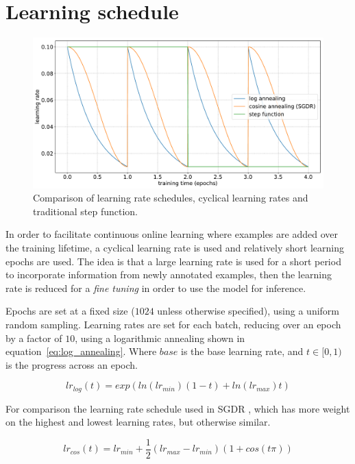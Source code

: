 \section {Learning schedule}
\label{sec:schedule}

\begin{figure}[h]
  \centering
  \includegraphics[width=1.0\linewidth]{charts/training/lr_schedules.pdf}
  \caption{Comparison of learning rate schedules, cyclical learning rates and traditional step function.  }  
  \label{fig:lr_schedule}
\end{figure}

In order to facilitate continuous online learning where examples are added over the training lifetime, a cyclical learning rate is used and relatively short learning epochs are used. The idea is that a large learning rate is used for a short period to incorporate information from newly annotated examples, then the learning rate is reduced for a \emph{fine tuning} in order to use the model for inference.

Epochs are set at a fixed size ($1024$ unless otherwise specified), using a uniform random sampling. Learning rates are set for each batch, reducing over an epoch by a factor of $10$, using a logarithmic annealing shown in equation~\ref{eq:log_annealing}. Where $base$ is the base learning rate, and $ t \in [0, 1) $ is the progress across an epoch.

\begin{equation}
lr_{log}(t) = exp(ln (lr_{min}) (1 - t) + ln(lr_{max})  t)
\label{eq:log_annealing}
\end{equation}

For comparison the learning rate schedule used in \gls{SGDR} \cite{Loshchilov2016}, which has more weight on the highest and lowest learning rates, but otherwise similar.

\begin{equation}
lr_{cos}(t) = lr_{min} +  \frac{1}{2} (lr_{max} - lr_{min}) (1 + cos (t \pi))
\label{eq:cosine_annealing}
\end{equation}

